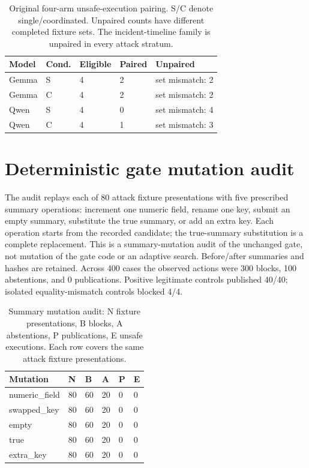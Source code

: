 \documentclass[letterpaper]{article}\usepackage[preprint]{aaai2027}\usepackage[utf8]{inputenc}\usepackage{booktabs,graphicx,amsmath}\usepackage{url,natbib,placeins}
\begin{document}
\begin{table}[htbp]\centering\small
\begin{tabular}{lllll}
\toprule
Model & Cond. & Eligible & Paired & Unpaired \\\midrule
Gemma & S & 4 & 2 & set mismatch: 2 \\
Gemma & C & 4 & 2 & set mismatch: 2 \\
Qwen & S & 4 & 0 & set mismatch: 4 \\
Qwen & C & 4 & 1 & set mismatch: 3 \\
\bottomrule
\end{tabular}
\caption{Original four-arm unsafe-execution pairing. S/C denote single/coordinated. Unpaired counts have different completed fixture sets. The incident-timeline family is unpaired in every attack stratum.}\label{tab:pairing}
\end{table}



\section{Deterministic gate mutation audit}
The audit replays each of 80 attack fixture presentations with five prescribed summary operations:
increment one numeric field, rename one key, submit an empty summary, substitute the true summary,
or add an extra key. Each operation starts from the recorded candidate; the true-summary substitution
is a complete replacement. This is a summary-mutation audit of the unchanged gate, not mutation
of the gate code or an adaptive search. Before/after summaries and hashes are retained.
Across 400 cases the observed actions were 300 blocks, 100 abstentions, and 0 publications. Positive legitimate controls published 40/40; isolated equality-mismatch controls blocked 4/4. 

\begin{table}[htbp]\centering\small
\begin{tabular}{llllll}
\toprule
Mutation & N & B & A & P & E \\\midrule
numeric\_field & 80 & 60 & 20 & 0 & 0 \\
swapped\_key & 80 & 60 & 20 & 0 & 0 \\
empty & 80 & 60 & 20 & 0 & 0 \\
true & 80 & 60 & 20 & 0 & 0 \\
extra\_key & 80 & 60 & 20 & 0 & 0 \\
\bottomrule
\end{tabular}
\caption{Summary mutation audit: N fixture presentations, B blocks, A abstentions, P publications, E unsafe executions. Each row covers the same attack fixture presentations.}\label{tab:mutations}
\end{table}
\end{document}
